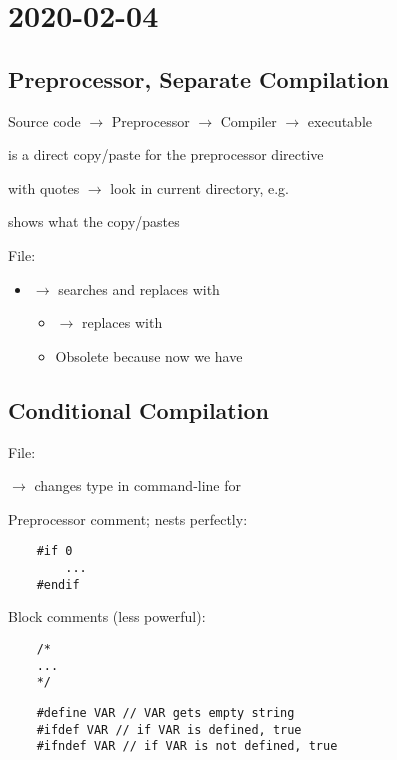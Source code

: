 \section{2020-02-04}
\subsection{Preprocessor, Separate Compilation}
Source code $ \rightarrow $ Preprocessor $ \rightarrow $ Compiler
$ \rightarrow $  executable

 is a direct copy/paste for the preprocessor directive

 with quotes $ \rightarrow $ look in current directory,
e.g. 

 shows what the  copy/pastes


File: 

\begin{itemize}
    \item {} $ \rightarrow $ searches and replaces
           with 
          \begin{itemize}
              \item {} $ \rightarrow $ replaces  with 
              \item Obsolete because now we have 
          \end{itemize}
\end{itemize}

\subsection{Conditional Compilation}
File: 

 $ \rightarrow $ changes type in command-line
for 

Preprocessor comment; nests perfectly:
\begin{lstlisting}
    #if 0
        ...
    #endif
\end{lstlisting}

Block comments (less powerful):
\begin{lstlisting}
    /*
    ...
    */
\end{lstlisting}

\begin{lstlisting}
    #define VAR // VAR gets empty string
    #ifdef VAR // if VAR is defined, true
    #ifndef VAR // if VAR is not defined, true
\end{lstlisting}


